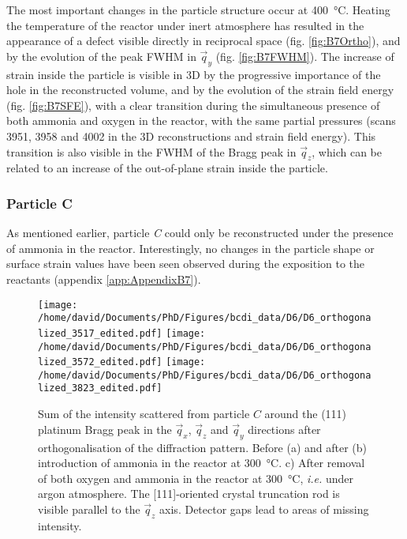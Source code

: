 The most important changes in the particle structure occur at \qty{400}{\degreeCelsius}.
Heating the temperature of the reactor under inert atmosphere has resulted in the appearance of a defect visible directly in reciprocal space (fig. \ref{fig:B7Ortho}), and by the evolution of the peak FWHM in $\vec{q}_y$ (fig. \ref{fig:B7FWHM}).
The increase of strain inside the particle is visible in 3D by the progressive importance of the hole in the reconstructed volume, and by the evolution of the strain field energy (fig. \ref{fig:B7SFE}), with a clear transition during the simultaneous presence of both ammonia and oxygen in the reactor, with the same partial pressures (scans 3951, 3958 and 4002 in the 3D reconstructions and strain field energy).
This transition is also visible in the FWHM of the Bragg peak in $\vec{q}_z$, which can be related to an increase of the out-of-plane strain inside the particle.

\subsubsection{Particle C}

As mentioned earlier, particle \textit{C} could only be reconstructed under the presence of ammonia in the reactor.
Interestingly, no changes in the particle shape or surface strain values have been seen observed during the exposition to the reactants (appendix \ref{app:AppendixB7}).

\begin{figure}[!htb]
    \centering
    \texttt{[image: /home/david/Documents/PhD/Figures/bcdi\_data/D6/D6\_orthogonalized\_3517\_edited.pdf]}
    \texttt{[image: /home/david/Documents/PhD/Figures/bcdi\_data/D6/D6\_orthogonalized\_3572\_edited.pdf]}
    \texttt{[image: /home/david/Documents/PhD/Figures/bcdi\_data/D6/D6\_orthogonalized\_3823\_edited.pdf]}
    \caption{
        Sum of the intensity scattered from particle $C$ around the (111) platinum Bragg peak in the $\vec{q}_x$, $\vec{q}_z$ and $\vec{q}_y$ directions after orthogonalisation of the diffraction pattern.
        Before (a) and after (b) introduction of ammonia in the reactor at \qty{300}{\degreeCelsius}.
        c) After removal of both oxygen and ammonia in the reactor at \qty{300}{\degreeCelsius}, \textit{i.e.} under argon atmosphere.
        The [111]-oriented crystal truncation rod is visible parallel to the $\vec{q}_z$ axis.
        Detector gaps lead to areas of missing intensity.
    }
    \label{fig:D6Ortho}
\end{figure}

